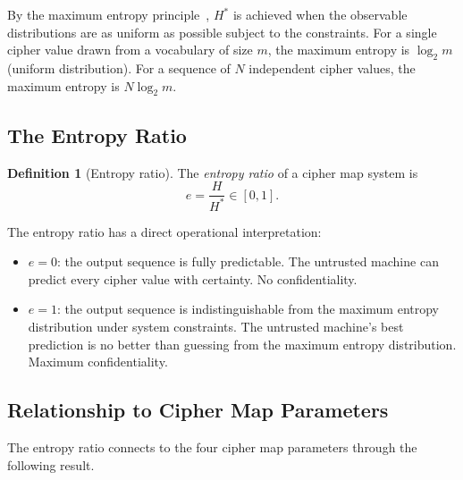 \documentclass[11pt]{article}
\theoremstyle{definition}
\newtheorem{definition}{Definition}[section]
\theoremstyle{plain}
\theoremstyle{remark}
\begin{document}
By the maximum entropy principle~\cite{jaynes1957information}, $H^*$ is
achieved when the observable distributions are as uniform as possible
subject to the constraints.  For a single cipher value drawn from a
vocabulary of size $m$, the maximum entropy is $\log_2 m$ (uniform
distribution).  For a sequence of $N$ independent cipher values, the
maximum entropy is $N \log_2 m$.

\subsection{The Entropy Ratio}

\begin{definition}[Entropy ratio]
\label{def:entropy-ratio}
The \emph{entropy ratio} of a cipher map system is
\begin{equation}
\label{eq:entropy-ratio}
e = \frac{H}{H^*} \in [0, 1].
\end{equation}
\end{definition}

The entropy ratio has a direct operational interpretation:

\begin{itemize}
\item $e = 0$: the output sequence is fully predictable.  The untrusted
  machine can predict every cipher value with certainty.  No
  confidentiality.

\item $e = 1$: the output sequence is indistinguishable from the maximum
  entropy distribution under system constraints.  The untrusted machine's
  best prediction is no better than guessing from the maximum entropy
  distribution.  Maximum confidentiality.
\end{itemize}

\subsection{Relationship to Cipher Map Parameters}

The entropy ratio connects to the four cipher map parameters through the
following result.
\end{document}
